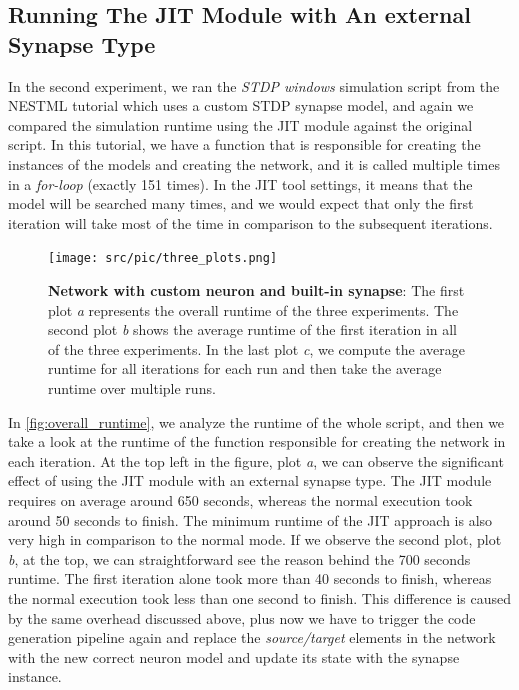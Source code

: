 \subsection*{Running The JIT Module with An external Synapse Type}

In the second experiment, we ran the \emph{STDP windows} simulation script from the NESTML tutorial which uses a custom STDP synapse model, and again we compared the simulation runtime using the JIT module against the original script. In this tutorial, we have a function that is responsible for creating the instances of the models and creating the network, and it is called multiple times in a \emph{for-loop} (exactly 151 times). In the JIT tool settings, it means that the model will be searched many times, and we would expect that only the first iteration will take most of the time in comparison to the subsequent iterations. 

\begin{figure}[ht!]
    \centering
    \texttt{[image: src/pic/three\_plots.png]}
    \caption{\textbf{Network with custom neuron and built-in synapse}: The first plot \emph{a} represents the overall runtime of the three experiments. The second plot \emph{b} shows the average runtime of the first iteration in all of the three experiments. In the last plot \emph{c}, we compute the average runtime for all iterations for each run and then take the average runtime over multiple runs.}
    \label{fig:overall_runtime}
\end{figure}

In \autoref{fig:overall_runtime}, we analyze the runtime of the whole script, and then we take a look at the runtime of the function responsible for creating the network in each iteration. At the top left in the figure, plot \emph{a}, we can observe the significant effect of using the JIT module with an external synapse type. The JIT module requires on average around 650 seconds, whereas the normal execution took around 50 seconds to finish. The minimum runtime of the JIT approach is also very high in comparison to the normal mode. If we observe the second plot, plot \emph{b}, at the top, we can straightforward see the reason behind the 700 seconds runtime. The first iteration alone took more than 40 seconds to finish, whereas the normal execution took less than one second to finish. This difference is caused by the same overhead discussed above, plus now we have to trigger the code generation pipeline again and replace the \emph{source/target} elements in the network with the new correct neuron model and update its state with the synapse instance. 

